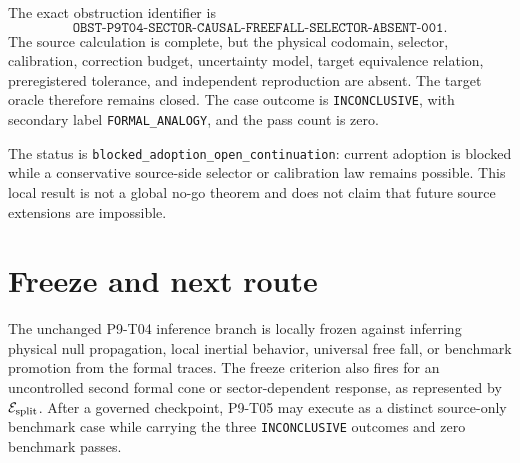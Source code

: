 \documentclass[11pt]{article}
\begin{document}
The exact obstruction identifier is
\[
\texttt{OBST-P9T04-SECTOR-CAUSAL-FREEFALL-SELECTOR-ABSENT-001}.
\]
The source calculation is complete, but the physical codomain, selector,
calibration, correction budget, uncertainty model, target equivalence
relation, preregistered tolerance, and independent reproduction are absent.
The target oracle therefore remains closed.  The case outcome is
\texttt{INCONCLUSIVE}, with secondary label \texttt{FORMAL\_ANALOGY}, and
the pass count is zero.

The status is \texttt{blocked\_adoption\_open\_continuation}: current
adoption is blocked while a conservative source-side selector or calibration
law remains possible.  This local result is not a global no-go theorem and
does not claim that future source extensions are impossible.

\section{Freeze and next route}

The unchanged P9-T04 inference branch is locally frozen against inferring
physical null propagation, local inertial behavior, universal free fall, or
benchmark promotion from the formal traces.  The freeze criterion also fires
for an uncontrolled second formal cone or sector-dependent response, as
represented by \(\mathcal E_{\rm split}\).  After a governed checkpoint,
P9-T05 may execute as a distinct source-only benchmark case while carrying
the three \texttt{INCONCLUSIVE} outcomes and zero benchmark passes.
\end{document}
